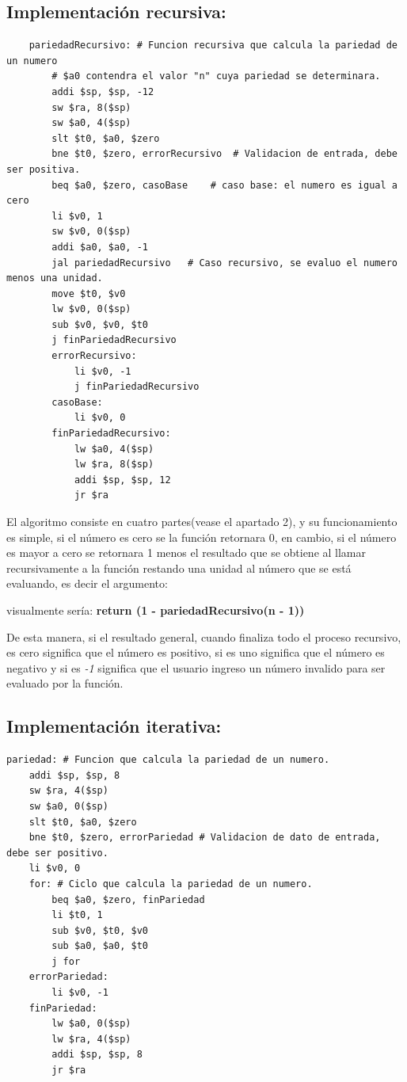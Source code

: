 \documentclass[12pt, a4paper]{article}
\begin{document}
    \subsection{Implementación recursiva: }
\begin{lstlisting}
    pariedadRecursivo: # Funcion recursiva que calcula la pariedad de un numero
    	# $a0 contendra el valor "n" cuya pariedad se determinara.
    	addi $sp, $sp, -12
    	sw $ra, 8($sp)
    	sw $a0, 4($sp)
    	slt $t0, $a0, $zero
    	bne $t0, $zero, errorRecursivo	# Validacion de entrada, debe ser positiva.
    	beq $a0, $zero, casoBase	# caso base: el numero es igual a cero
    	li $v0, 1
    	sw $v0, 0($sp)
    	addi $a0, $a0, -1
    	jal pariedadRecursivo	# Caso recursivo, se evaluo el numero menos una unidad.
    	move $t0, $v0
    	lw $v0, 0($sp)
    	sub $v0, $v0, $t0
    	j finPariedadRecursivo
    	errorRecursivo:
    		li $v0, -1
    		j finPariedadRecursivo
    	casoBase:
    		li $v0, 0
    	finPariedadRecursivo:
    		lw $a0, 4($sp)
    		lw $ra, 8($sp)
    		addi $sp, $sp, 12
    		jr $ra
\end{lstlisting}
El algoritmo consiste en cuatro partes(vease el apartado 2), y su funcionamiento es simple, si el número es cero se la función retornara 0, en cambio, si el número es mayor a cero se retornara 1 menos el resultado que se obtiene al llamar recursivamente a la función restando una unidad al número que se está evaluando, es decir el argumento:

visualmente sería: \textbf{return (1 - pariedadRecursivo(n - 1))}

De esta manera, si el resultado general, cuando finaliza todo el proceso recursivo, es cero significa que el número es positivo, si es uno significa que el número es negativo y si es \textit{-1} significa que el usuario ingreso un número invalido para ser evaluado por la función.

\newpage

\subsection{Implementación iterativa: }

\begin{lstlisting}
pariedad: # Funcion que calcula la pariedad de un numero.
	addi $sp, $sp, 8
	sw $ra, 4($sp)
	sw $a0, 0($sp)
	slt $t0, $a0, $zero
	bne $t0, $zero, errorPariedad # Validacion de dato de entrada, debe ser positivo.
	li $v0, 0
	for: # Ciclo que calcula la pariedad de un numero.
		beq $a0, $zero, finPariedad
		li $t0, 1
		sub $v0, $t0, $v0
		sub $a0, $a0, $t0
		j for
	errorPariedad:
		li $v0, -1
	finPariedad:
		lw $a0, 0($sp)
		lw $ra, 4($sp)
		addi $sp, $sp, 8
		jr $ra
\end{lstlisting}
\end{document}

